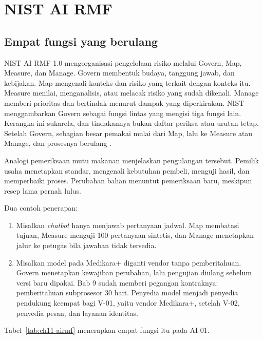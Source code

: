 \section{NIST AI RMF}

\subsection*{Empat fungsi yang berulang}

NIST AI RMF 1.0 mengorganisasi pengelolaan risiko melalui Govern, Map, Measure, dan Manage. Govern
membentuk budaya, tanggung jawab, dan kebijakan. Map mengenali konteks dan risiko yang terkait
dengan konteks itu. Measure menilai, menganalisis, atau melacak risiko yang sudah dikenali. Manage
memberi prioritas dan bertindak menurut dampak yang diperkirakan. NIST menggambarkan Govern sebagai
fungsi lintas yang mengisi tiga fungsi lain. Kerangka ini sukarela, dan tindakannya bukan daftar
periksa atau urutan tetap. Setelah Govern, sebagian besar pemakai mulai dari Map, lalu ke Measure
atau Manage, dan prosesnya berulang \cite{c11-nist-airmf}.

Analogi pemeriksaan mutu makanan menjelaskan pengulangan tersebut. Pemilik usaha menetapkan
standar, mengenali kebutuhan pembeli, menguji hasil, dan memperbaiki proses. Perubahan bahan
menuntut pemeriksaan baru, meskipun resep lama pernah lulus.

Dua contoh penerapan:
\begin{enumerate}
  \item Misalkan \textit{chatbot} hanya menjawab pertanyaan jadwal. Map membatasi tujuan, Measure
  menguji 100 pertanyaan sintetis, dan Manage menetapkan jalur ke petugas bila jawaban tidak
  tersedia.
  \item Misalkan model pada Medikara+ diganti vendor tanpa pemberitahuan. Govern menetapkan
  kewajiban perubahan, lalu pengujian diulang sebelum versi baru dipakai. Bab 9 sudah memberi
  pegangan kontraknya: pemberitahuan subprosesor 30 hari. Penyedia model menjadi penyedia pendukung
  keempat bagi V-01, yaitu vendor Medikara+, setelah V-02, penyedia pesan, dan layanan identitas.
\end{enumerate}

Tabel~\ref{tab:ch11-airmf} menerapkan empat fungsi itu pada AI-01.

